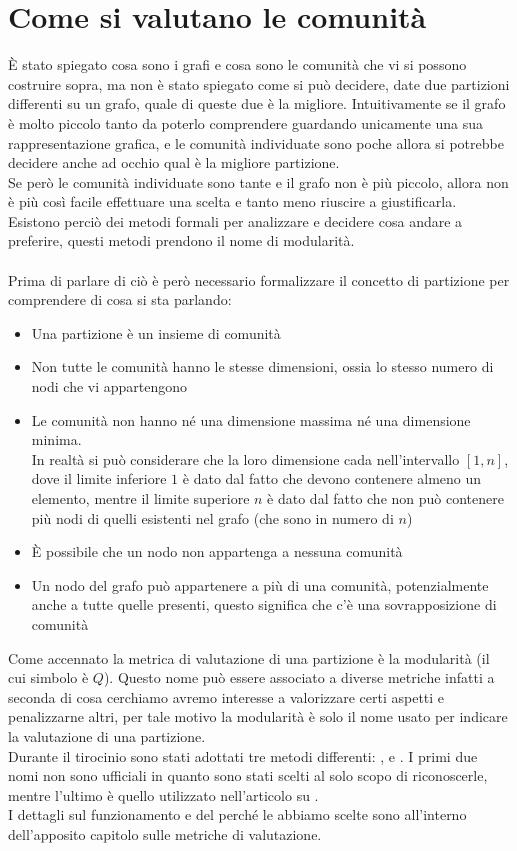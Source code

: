 \section{Come si valutano le comunità}
È stato spiegato cosa sono i grafi e cosa sono le comunità che vi si possono costruire sopra, ma non è stato spiegato come si può decidere, date due partizioni differenti su un grafo, quale di queste due è la migliore. Intuitivamente se il grafo è molto piccolo tanto da poterlo comprendere guardando unicamente una sua rappresentazione grafica, e le comunità individuate sono poche allora si potrebbe decidere anche ad occhio qual è la migliore partizione.\\
Se però le comunità individuate sono tante e il grafo non è più piccolo, allora non è più così facile effettuare una scelta e tanto meno riuscire a giustificarla. Esistono perciò dei metodi formali per analizzare e decidere cosa andare a preferire, questi metodi prendono il nome di modularità.\\
\\
Prima di parlare di ciò è però necessario formalizzare il concetto di partizione per comprendere di cosa si sta parlando:
\begin{itemize}
	\item Una partizione è un insieme di comunità
	\item Non tutte le comunità hanno le stesse dimensioni, ossia lo stesso numero di nodi che vi appartengono
	\item Le comunità non hanno né una dimensione massima né una dimensione minima.\\
	In realtà si può considerare che la loro dimensione cada nell'intervallo $[1, n]$, dove il limite inferiore $1$ è dato dal fatto che devono contenere almeno un elemento, mentre il limite superiore $n$ è dato dal fatto che non può contenere più nodi di quelli esistenti nel grafo (che sono in numero di $n$)
	\item È possibile che un nodo non appartenga a nessuna comunità
	\item Un nodo del grafo può appartenere a più di una comunità, potenzialmente anche a tutte quelle presenti, questo significa che c'è una sovrapposizione di comunità
\end{itemize}
Come accennato la metrica di valutazione di una partizione è la modularità (il cui simbolo è $Q$). Questo nome può essere associato a diverse metriche infatti a seconda di cosa cerchiamo avremo interesse a valorizzare certi aspetti e penalizzarne altri, per tale motivo la modularità è solo il nome usato per indicare la valutazione di una partizione.\\
Durante il tirocinio sono stati adottati tre metodi differenti: \mmax, \mover e \mmod. I primi due nomi non sono ufficiali in quanto sono stati scelti al solo scopo di riconoscerle, mentre l'ultimo \mmod è quello utilizzato nell'articolo su \cnrl \cite{tu2016community}.\\
I dettagli sul funzionamento e del perché le abbiamo scelte sono all'interno dell'apposito capitolo sulle metriche di valutazione.
%
